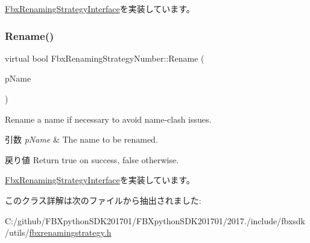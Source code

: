 \hyperlink{class_fbx_renaming_strategy_interface_ab394ed8a9b5d3ec40334bc933af83907}{Fbx\+Renaming\+Strategy\+Interface}を実装しています。

\mbox{\label{class_fbx_renaming_strategy_number_ae619f9e95e3fcb215a12728dfb739659}} 
\subsubsection{\texorpdfstring{Rename()}{Rename()}}
{\footnotesize\ttfamily virtual bool Fbx\+Renaming\+Strategy\+Number\+::\+Rename (\begin{DoxyParamCaption}\item[{\hyperlink{class_fbx_name_handler}{Fbx\+Name\+Handler} \&}]{p\+Name }\end{DoxyParamCaption})\hspace{0.3cm}{\ttfamily [virtual]}}

Rename a name if necessary to avoid name-\/clash issues. 
\begin{DoxyParams}{引数}
{\em p\+Name} & The name to be renamed. \\
\hline
\end{DoxyParams}
\begin{DoxyReturn}{戻り値}
Return {\ttfamily true} on success, {\ttfamily false} otherwise. 
\end{DoxyReturn}


\hyperlink{class_fbx_renaming_strategy_interface_a1b91016c68dd9c7031624026fd39638a}{Fbx\+Renaming\+Strategy\+Interface}を実装しています。



このクラス詳解は次のファイルから抽出されました\+:\begin{DoxyCompactItemize}
\item 
C\+:/github/\+F\+B\+Xpython\+S\+D\+K201701/\+F\+B\+Xpython\+S\+D\+K201701/2017./include/fbxsdk/utils/\hyperlink{fbxrenamingstrategy_8h}{fbxrenamingstrategy.\+h}\end{DoxyCompactItemize}
